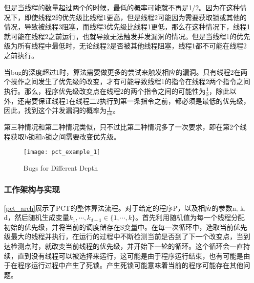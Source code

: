 但是当线程的数量超过两个的时候，最低的概率可能就不再是1/2。因为在这种情况下，即使线程2的优先级比线程1更高，但是线程2可能因为需要获取锁或其他的情况，导致被线程3阻塞，而线程3优先级比线程1更低，那么在这种情况下，线程1就可能在线程2之前运行，也就导致无法触发并发漏洞的情况。但是当线程1的优先级为所有线程中最低时，无论线程2是否被其他线程阻塞，线程1都不可能在线程2之前执行。

当bug的深度超过1时，算法需要做更多的尝试来触发相应的漏洞。只有线程2在两个操作之间发生了优先级的改变，才有可能导致线程1的指令在线程2两个指令之间执行。那么，程序优先级改变点在线程2的两个指令之间的可能性为$\frac{1}{k}$，除此以外，还需要保证线程1在线程二2执行到第一条指令之前，都必须是最低的优先级，因此，找到这个并发漏洞的概率为$\frac{1}{nk}$。

第三种情况和第二种情况类似，只不过比第二种情况多了一次要求，即在第2个线程获取b锁和a锁之间需要改变优先级。

\begin{figure}[ht]
    \centering
    \texttt{[image: pct\_example\_1]}
    \caption{\label{fig:pct_example}Bugs for Different Depth}
\end{figure}

\subsubsection{工作架构与实现}

\autoref{pct_arch}展示了PCT的整体算法流程。对于给定的程序P，以及相应的参数n, k, d，然后随机生成变量$k_1, \cdots, k_{d-1} \in \{1, \cdots, k\}$。首先利用随机值为每一个线程分配初始的优先级，并将当前的调度储存在S变量中。在每一次循环中，选取当前优先级最大的线程并执行，在运行的过程中不断检测当前是否到了下一个改变点，当到达检测点时，就改变当前线程的优先级，并开始下一轮的循环。这个循环会一直持续，直到没有线程可以被选择来运行，这可能是由于程序运行结束，也有可能是由于在程序运行过程中产生了死锁。产生死锁可能意味着当前的程序可能存在其他问题。


